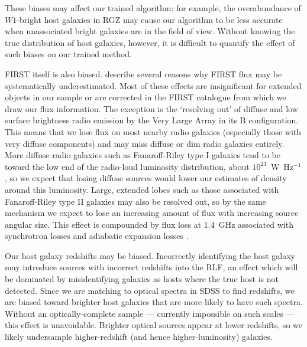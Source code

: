     These biases may affect our
    trained algorithm: for example, the overabundance of $W1$-bright host
    galaxies in RGZ may cause our algorithm to be less accurate when
    unassociated bright galaxies are in the field of view. Without knowing the true
    distribution of host galaxies, however, it is difficult to quantify the
    effect of such biases on our trained method.

    FIRST itself is also biased. \citet{helfand15first} describe several reasons why FIRST flux may be systematically underestimated. Most of these effects are insignificant for extended objects in our sample or are corrected in the FIRST catalogue from which we draw our flux information. The exception is the `resolving out' of diffuse and low surface brightness radio emission by the Very Large Array in its B configuration. This means that we lose flux on most nearby radio galaxies (especially those with very
    diffuse components) and may miss diffuse or dim radio galaxies entirely.
    More diffuse radio galaxies such as Fanaroff-Riley type I \citep[FRI;][]{Fanaroff1974} galaxies tend to
    be toward the low end of the radio-loud luminosity distribution, about
    $10^{23}$~W~Hz$^{-1}$ \citep{best09radio}, so we expect that losing
    diffuse sources would lower our estimates of density around this
    luminosity. Large, extended lobes such as those associated with Fanaroff-Riley type II \citep[FRII;][]{Fanaroff1974} galaxies may also be resolved out, so by the same mechanism we expect to lose an increasing amount of flux with increasing source angular size. This effect is compounded by flux loss at 1.4~GHz associated with synchrotron losses and adiabatic expansion losses \citep{blundell99doubles}.

    Our host galaxy redshifts may be biased. Incorrectly identifying the host galaxy may introduce sources with incorrect redshifts into the RLF, an effect which will be dominated by misidentifying galaxies as hosts where the true host is not detected. Since we are matching to optical spectra in SDSS to find
    redshifts, we are biased toward brighter host galaxies that are more
    likely to have such spectra. Without an optically-complete sample ---
    currently impossible on such scales --- this effect is unavoidable.
    Brighter optical sources appear at lower redshifts, so we likely
    undersample higher-redshift (and hence higher-luminosity) galaxies.

